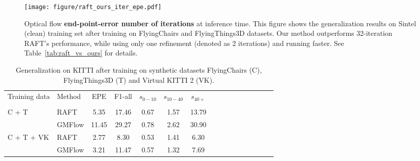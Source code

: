 \documentclass[10pt,twocolumn,letterpaper]{article}
\begin{document}
\begin{figure}
    \centering
    \texttt{[image: figure/raft\_ours\_iter\_epe.pdf]}
    \vspace{-12pt}
    \caption{%
    Optical flow \textbf{end-point-error \vs number of iterations} at inference time. This figure shows the generalization results on Sintel (clean) training set after training on FlyingChairs and FlyingThings3D datasets. 
    Our method outperforms 32-iteration RAFT's performance, while using only one refinement (denoted as 2 iterations) and running faster. See Table~\ref{tab:raft_vs_ours} for details.
    }
    \label{fig:iter_vs_epe}
    \vspace{-6pt}
\end{figure}







\begin{table}[t]
    \centering
    \setlength{\tabcolsep}{1.5pt} %
    \begin{tabular}{llcccccccccccccc}
    \toprule
    
    Training data & Method & EPE & F1-all & $s_{0-10}$ & $s_{10-40}$ & $s_{40+}$ &   \\

    \addlinespace[-12pt] \\
    
    \midrule
    
    \multirow{2}{*}[-2pt]{C + T} & RAFT & 5.35 & 17.46 & 0.67 & 1.57 & 13.79 \\
    & GMFlow & 11.45 & 29.27 & 0.78 & 2.62 & 30.90 \\
    
    \midrule
    
    \multirow{2}{*}[-2pt]{C + T + VK} & RAFT & 2.77 & 8.30 & 0.53 & 1.41 & 6.30 \\
    & GMFlow & 3.21 & 11.47 & 0.57 & 1.32 & 7.69 \\


    \bottomrule
    \end{tabular}
    \vspace{-5pt}
    \caption{Generalization on KITTI after training on synthetic datasets FlyingChairs (C), FlyingThings3D (T) and Virtual KITTI 2 (VK). 
    }
    \label{tab:gen_kitti}
    \vspace{-10pt}
    
    
\end{table}
\end{document}

